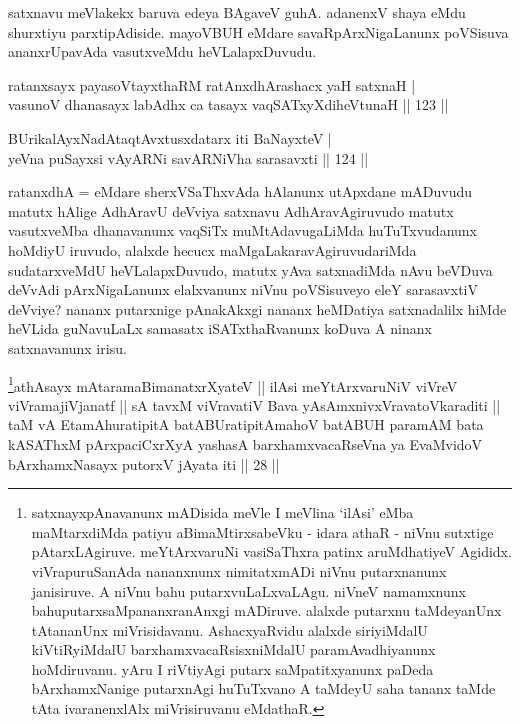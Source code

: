 \begin{artha}
satxnavu meVlakekx baruva edeya BAgaveV guhA. adanenxV shaya eMdu 
shurxtiyu parxtipAdiside. mayoVBUH eMdare savaRpArxNigaLanunx 
poVSisuva ananxrUpavAda vasutxveMdu heVLalapxDuvudu.
\end{artha}


\begin{shl}
ratanxsayx payasoV\s tayxthaRM ratAnxdhArashacx yaH satxnaH | \\
vasunoV dhanasayx labAdhx ca tasayx vaqSATxyXdiheVtunaH \hfill|| 123 || 
\end{shl}

\begin{shl}
BUrikalAyxNadAtaqtAvxtusxdatarx iti BaNayxteV | \\
yeVna puSayxsi vAyARNi savARNiVha sarasavxti \hfill|| 124 || 
\end{shl}

\begin{artha}
ratanxdhA = eMdare sherxVSaThxvAda hAlanunx utApxdane mADuvudu matutx hAlige AdhAravU deVviya satxnavu AdhAravAgiruvudo matutx vasutxveMba dhanavanunx vaqSiTx muMtAdavugaLiMda huTuTxvudanunx hoMdiyU iruvudo, alalxde hecucx maMgaLakaravAgiruvudariMda sudatarxveMdU heVLalapxDuvudo, matutx yAva satxnadiMda nAvu beVDuva deVvAdi pArxNigaLanunx elalxvanunx niVnu poVSisuveyo eleY sarasavxtiV deVviye? nananx putarxnige pAnakAkxgi nananx heMDatiya satxnadalilx hiMde heVLida guNavuLaLx samasatx iSATxthaRvanunx koDuva A ninanx satxnavanunx irisu.
\end{artha}

\begin{kandikeshl}
\footnote{satxnayxpAnavanunx mADisida meVle I meVlina `ilAsi' eMba maMtarxdiMda patiyu aBimaMtirxsabeVku - idara athaR - niVnu sutxtige pAtarxLAgiruve. meYtArxvaruNi vasiSaThxra patinx aruMdhatiyeV Agididx. viVrapuruSanAda nananxnunx nimitatxmADi niVnu putarxnanunx janisiruve. A niVnu bahu putarxvuLaLxvaLAgu. niVneV namamxnunx bahuputarxsaMpananxranAnxgi mADiruve. alalxde putarxnu taMdeyanUnx tAtananUnx miVrisidavanu. AshacxyaRvidu alalxde siriyiMdalU kiVtiRyiMdalU barxhamxvacaRsisxniMdalU paramAvadhiyanunx hoMdiruvanu. yAru I riVtiyAgi putarx saMpatitxyanunx paDeda bArxhamxNanige putarxnAgi huTuTxvano A taMdeyU saha tananx taMde tAta ivaranenxlAlx miVrisiruvanu eMdathaR.}athAsayx mAtaramaBimanatxrXyateV || ilAsi meYtArxvaruNiV viVreV viVramajiVjanatf || sA tavxM viVravatiV Bava yAsAmxnivxVravatoV\s karaditi || taM vA EtamAhuratipitA batABUratipitAmahoV batABUH paramAM bata kASAThxM pArxpaciCxrXyA yashasA barxhamxvacaRseVna ya EvaMvidoV bArxhamxNasayx putorxV jAyata iti || 28 ||
\end{kandikeshl}

